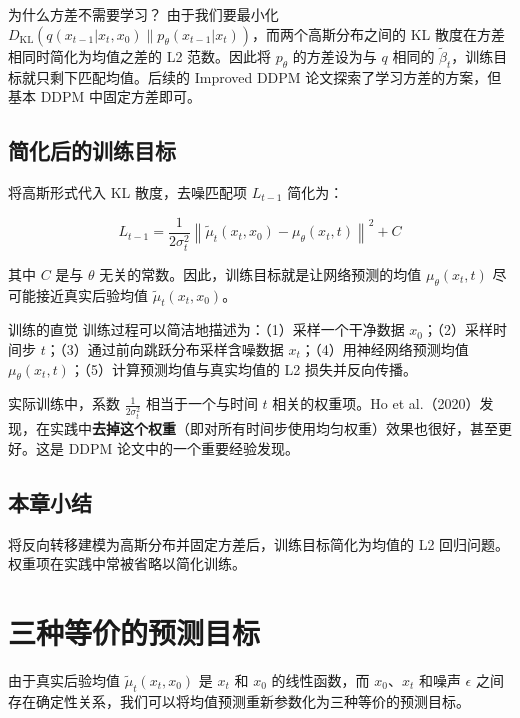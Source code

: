 \documentclass[a4paper]{article}
\begin{document}
\begin{knowledgebox}{为什么方差不需要学习？}
由于我们要最小化 $D_{\text{KL}}(q(x_{t-1}|x_t,x_0) \| p_\theta(x_{t-1}|x_t))$，而两个高斯分布之间的 KL 散度在方差相同时简化为均值之差的 L2 范数。因此将 $p_\theta$ 的方差设为与 $q$ 相同的 $\tilde{\beta}_t$，训练目标就只剩下匹配均值。后续的 Improved DDPM 论文探索了学习方差的方案，但基本 DDPM 中固定方差即可。
\end{knowledgebox}

\subsection{简化后的训练目标}

将高斯形式代入 KL 散度，去噪匹配项 $L_{t-1}$ 简化为：

$$L_{t-1} = \frac{1}{2\sigma_t^2} \left\| \tilde{\mu}_t(x_t, x_0) - \mu_\theta(x_t, t) \right\|^2 + C$$

其中 $C$ 是与 $\theta$ 无关的常数。因此，训练目标就是让网络预测的均值 $\mu_\theta(x_t, t)$ 尽可能接近真实后验均值 $\tilde{\mu}_t(x_t, x_0)$。

\begin{importantbox}{训练的直觉}
训练过程可以简洁地描述为：（1）采样一个干净数据 $x_0$；（2）采样时间步 $t$；（3）通过前向跳跃分布采样含噪数据 $x_t$；（4）用神经网络预测均值 $\mu_\theta(x_t, t)$；（5）计算预测均值与真实均值的 L2 损失并反向传播。
\end{importantbox}

实际训练中，系数 $\frac{1}{2\sigma_t^2}$ 相当于一个与时间 $t$ 相关的权重项。Ho et al.（2020）发现，在实践中\textbf{去掉这个权重}（即对所有时间步使用均匀权重）效果也很好，甚至更好。这是 DDPM 论文中的一个重要经验发现。

\subsection{本章小结}

将反向转移建模为高斯分布并固定方差后，训练目标简化为均值的 L2 回归问题。权重项在实践中常被省略以简化训练。


\section{三种等价的预测目标}

由于真实后验均值 $\tilde{\mu}_t(x_t, x_0)$ 是 $x_t$ 和 $x_0$ 的线性函数，而 $x_0$、$x_t$ 和噪声 $\epsilon$ 之间存在确定性关系，我们可以将均值预测重新参数化为三种等价的预测目标。
\end{document}
